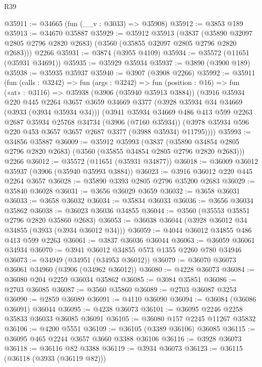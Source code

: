 \begin{lexlean}{R39}
\begin{coremodule}
@35911 := @34665 (fun (__v : @3033) => @35908)
@35912 := @3853 @189
@35913 := @34670 @35887
@35929 := @35912
    @35913
    (@3837 (@35890 @32097 @2805 @2796 @2820 @2683) (@3560 (@35855 @32097 @2805 @2796 @2820 @2683)))
    @2266
@35931 := @3874 (@3955 @4109)
@35934 := @35572 (@11651 (@35931 @34691))
@35935 := @35929 @35934
@35937 := @3890 (@3900 @189)
@35938 := @35935 @35937
@35940 := @3907 (@3908 @2266)
@35992 := @35911
    (fun (calls : @3242) =>
    fun (args : @3242) =>
    fun (position : @16) =>
    fun («at» : @3116) =>
    @35938
      (@3906 (@35940 @35913 @3884))
      (@3916
        @35934
        @220
        @445
        @2264
        @3657
        @3659
        @34669
        @3377
        (@3928 @35934 @34 @34669 (@3933 (@3934 @35934 @34)))
        (@3941
          @35934
          @34669
          @486
          @413
          @599
          @2263
          @2687
          @35934
          @25768
          @34734
          (@3906 (@7160 @35934))
          (@3978 @35934 @596 @220 @453 @3657 @3657 @2687 @3377 (@3988 @35934) @11795))))
@35993 := @34856 @35887
@36009 := @35912
    @35993
    (@3837 (@35890 @34854 @2805 @2796 @2820 @2683) (@3560 (@35855 @34854 @2805 @2796 @2820 @2683)))
    @2266
@36012 := @35572 (@11651 (@35931 @34877))
@36018 := @36009 @36012 @35937 (@3906 (@35940 @35993 @3884))
@36023 := @3916 @36012 @220 @445 @2264 @3657
@36028 := @35890 @3393 @2805 @2796 @35200 @2683
@36029 := @35840 @36028
@36031 := @3656 @36029 @3659
@36032 := @3658 @36031
@36033 := @3658 @36032
@36034 := @35834 @36033
@36036 := @3656 @36034 @35862
@36038 := @36023 @36036 @34855
@36044 := @3560 (@35553 @35851 @2796 @2820 @35860 @2683)
@36053 := @36038 @36044 (@3928 @36012 @34 @34855 (@3933 (@3934 @36012 @34)))
@36059 := @4044 @36012 @34855 @486 @413 @599 @2263
@36061 := @3837 @36036 @36044
@36063 := @36059 @36061 @34934
@36070 := @3941 @36012 @34855 @573 @1355 @2260 @780 @34946
@36073 := @34949 (@34951 (@34953 @36012))
@36079 := @36070 @36073 @36061 @34960 (@3906 (@34962 @36012))
@36080 := @4228 @36073
@36084 := @36080 @204 @2259 @36034 @35862
@36085 := @3084 @35851
@36086 := @2703 @36085
@36087 := @3560 @35860
@36089 := @2703 @36087 @3253
@36090 := @2859 @36089
@36091 := @4110 @36090
@36094 := @36084 (@36086 @36091) @36044
@36095 := @4238 @36073
@36101 := @36095 @2246 @2258 @35833 @36033 @36085 @36091
@36105 := @36080 @157 @2245 @11267 @35832
@36106 := @4200 @5551
@36109 := @36105 (@3389 @36106) @36085
@36115 := @36095 @465 @2244 @3657 @3660 @3388 @36106
@36116 := @3928 @36073
@36118 := @36116 @82 @3388
@36119 := @3934 @36073
@36123 := @36115 (@36118 (@3933 (@36119 @82)))

\end{coremodule}
\end{lexlean}
